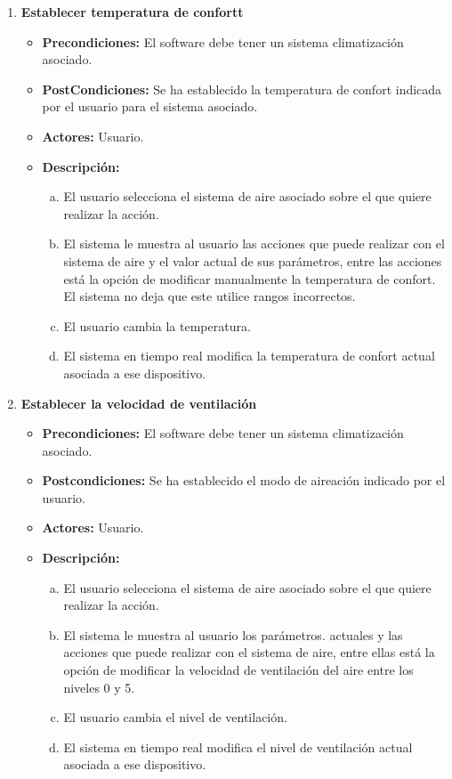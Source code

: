 \begin{enumerate}
    \item \textbf{Establecer temperatura de confortt}
          \begin{itemize}
              \item \textbf{Precondiciones:} El software debe tener un sistema climatización asociado.
              \item \textbf{PostCondiciones:} Se ha establecido la temperatura de confort indicada por el usuario para el sistema asociado.
              \item \textbf{Actores:} Usuario.
              \item \textbf{Descripción:}
                    \begin{enumerate}[a.]
                        \item El usuario selecciona el sistema de aire asociado sobre el que quiere realizar la acción.
                        \item El sistema le muestra al usuario las acciones que puede realizar con el sistema de aire y el valor actual de sus parámetros, entre las acciones está la opción de modificar manualmente la temperatura de confort. El sistema no deja que este utilice rangos incorrectos.
                        \item El usuario cambia la temperatura.
                        \item El sistema en tiempo real modifica la temperatura de confort actual asociada a ese dispositivo.
                    \end{enumerate}
          \end{itemize}

    \item \textbf{Establecer la velocidad de ventilación}
          \begin{itemize}
              \item \textbf{Precondiciones:} El software debe tener un sistema climatización asociado.
              \item \textbf{Postcondiciones:} Se ha establecido el modo de aireación indicado por el usuario.
              \item \textbf{Actores:} Usuario.
              \item \textbf{Descripción:}
                    \begin{enumerate}[a.]
                        \item El usuario selecciona el sistema de aire asociado sobre el que quiere realizar la acción.
                        \item El sistema le muestra al usuario los parámetros. actuales y las acciones que puede realizar con el sistema de aire, entre ellas está la opción de modificar la velocidad de ventilación del aire entre los niveles 0 y 5.
                        \item El usuario cambia el nivel de ventilación.
                        \item El sistema en tiempo real modifica el nivel de ventilación actual asociada a ese dispositivo.
                    \end{enumerate}
          \end{itemize}



\end{enumerate}
